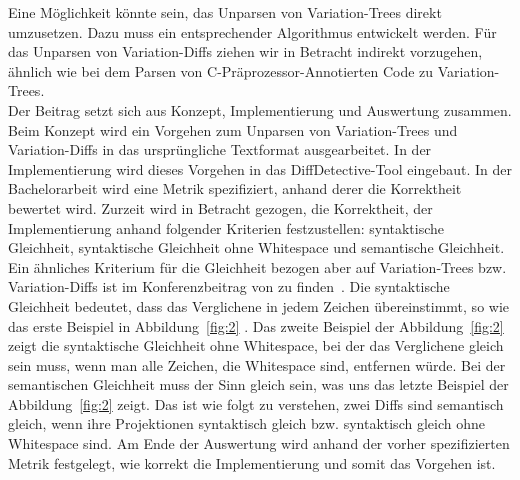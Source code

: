 Eine Möglichkeit könnte sein, das Unparsen von Variation-Trees direkt umzusetzen. Dazu muss ein entsprechender Algorithmus entwickelt werden. Für das Unparsen von Variation-Diffs ziehen wir in Betracht indirekt vorzugehen, ähnlich wie bei dem Parsen von C-Präprozessor-Annotierten Code zu Variation-Trees.\\


Der Beitrag setzt sich aus Konzept, Implementierung und Auswertung zusammen. Beim Konzept wird ein Vorgehen zum Unparsen von Variation-Trees und Variation-Diffs in das ursprüngliche Textformat ausgearbeitet. In der Implementierung wird dieses Vorgehen in das DiffDetective-Tool eingebaut. In der Bachelorarbeit wird eine Metrik spezifiziert, anhand derer die Korrektheit bewertet wird. Zurzeit wird in Betracht gezogen, die Korrektheit, der Implementierung anhand folgender Kriterien festzustellen: syntaktische Gleichheit, syntaktische Gleichheit ohne Whitespace und semantische Gleichheit. Ein ähnliches Kriterium für die Gleichheit bezogen aber auf Variation-Trees bzw. Variation-Diffs ist im Konferenzbeitrag von %
 zu finden~\cite{BSG+:SPLC23}.  Die syntaktische Gleichheit bedeutet, dass das Verglichene in jedem Zeichen übereinstimmt, so wie das erste Beispiel in Abbildung~\ref{fig:2} . Das zweite Beispiel der Abbildung~\ref{fig:2} zeigt die syntaktische Gleichheit ohne Whitespace, bei der das Verglichene gleich sein muss, wenn man alle Zeichen, die Whitespace sind, entfernen würde. Bei der semantischen Gleichheit muss der Sinn gleich sein, was uns das letzte Beispiel der Abbildung~\ref{fig:2}    zeigt. Das ist wie folgt zu verstehen, zwei Diffs sind semantisch gleich, wenn ihre Projektionen syntaktisch gleich bzw. syntaktisch gleich ohne Whitespace sind. Am Ende der Auswertung wird anhand der vorher spezifizierten Metrik festgelegt, wie korrekt die Implementierung und somit das Vorgehen ist.\\


